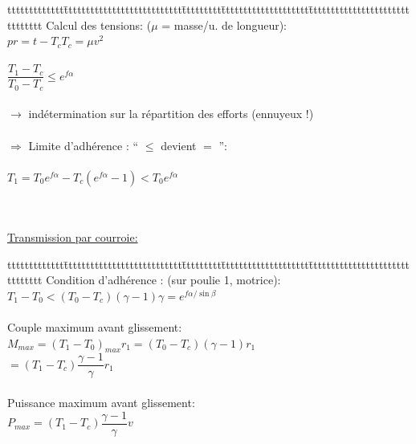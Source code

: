 \begin{bluebox}
\begin{tabbing}
ttttttttttttt\=ttttttttttttttttttttttttttt\=ttttttttt\=tttttttttttttttttttt\=ttttttttttttttttttttttttttttttt\kill
Calcul des tensions: ($\mu$ = masse/u. de longueur): \\
\>$pr=t-T_c$\>\>$T_c = \mu v^2$\\\\
\>$\dfrac{T_1-T_c}{T_0-T_c}\leq e^{f\alpha}$\\\\
$\rightarrow$ {\color{orange}indétermination} sur la répartition des efforts (ennuyeux !)\\\\
$\Rightarrow$ {\color{orange}Limite d’adhérence} : “ $\leq$ devient $=$ ”:\\\\
\> $T_1 = T_0e^{f\alpha} - T_c(e^{f\alpha}-1) < T_0e^{f\alpha}$
\end{tabbing}
\end{bluebox}\\\\

\underline{Transmission par courroie:}\\

\begin{bluebox}
\begin{tabbing}
ttttttttttttt\=ttttttttttttttttttttttttttt\=ttttttttt\=tttttttttttttttttttt\=ttttttttttttttttttttttttttttttt\kill
Condition d’adhérence : (sur poulie 1, motrice):\\
\>$T_1-T_0 <(T_0-T_c)(\gamma-1)$\>\>\>$\gamma = e^{f\alpha/\sin\beta}$\\\\
Couple maximum avant glissement: \\
\>$M_{max} = (T_1-T_0)_{max}r_1$\>\>$=(T_0-T_c)(\gamma-1)r_1$\\
\>\>\>$=(T_1-T_c)\dfrac{\gamma-1}{\gamma}r_1$\\\\
Puissance maximum avant glissement: \\
\>$P_{max} = (T_1-T_c)\dfrac{\gamma-1}{\gamma}v$
\end{tabbing}
\end{bluebox}\\\\




